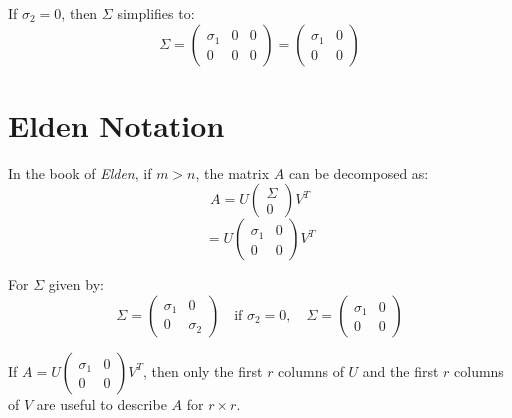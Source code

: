 \documentclass[a4paper, 12pt]{article}
\begin{document}
If $\sigma_2 = 0$, then $\Sigma$ simplifies to:
\[
\Sigma = \begin{pmatrix}
\sigma_1 & 0 & 0 \\
0 & 0 & 0
\end{pmatrix} = \begin{pmatrix}
\sigma_1 & 0 \\
0 & 0
\end{pmatrix}
\]

\section*{Elden Notation}
In the book of \textit{Elden}, if $m > n$, the matrix $A$ can be decomposed as:
\[
A = U \begin{pmatrix}
\Sigma \\
0
\end{pmatrix} V^T
\]
\[
= U \begin{pmatrix}
\sigma_1 & 0 \\
0 & 0
\end{pmatrix} V^T
\]

For $\Sigma$ given by:
\[
\Sigma = \begin{pmatrix}
\sigma_1 & 0 \\
0 & \sigma_2
\end{pmatrix} \quad \text{if } \sigma_2 = 0, \quad \Sigma = \begin{pmatrix}
\sigma_1 & 0 \\
0 & 0
\end{pmatrix}
\]

If $A = U \begin{pmatrix}
\sigma_1 & 0 \\
0 & 0
\end{pmatrix} V^T$, then only the first $r$ columns of $U$ and the first $r$ columns of $V$ are useful to describe $A$ for $r \times r$.
\end{document}
